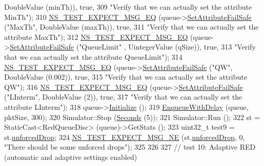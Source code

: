 \begin{DoxyCode}
      DoubleValue (minTh)), \textcolor{keyword}{true},
309                          \textcolor{stringliteral}{"Verify that we can actually set the attribute MinTh"});
310   \hyperlink{group__testing_ga7304ba46a28d8cf08dfdfd6499cf7068}{NS\_TEST\_EXPECT\_MSG\_EQ} (queue->\hyperlink{classns3_1_1ObjectBase_aa7d333004e970f925a4ed5df275541b5}{SetAttributeFailSafe} (\textcolor{stringliteral}{"MaxTh"}, 
      DoubleValue (maxTh)), \textcolor{keyword}{true},
311                          \textcolor{stringliteral}{"Verify that we can actually set the attribute MaxTh"});
312   \hyperlink{group__testing_ga7304ba46a28d8cf08dfdfd6499cf7068}{NS\_TEST\_EXPECT\_MSG\_EQ} (queue->\hyperlink{classns3_1_1ObjectBase_aa7d333004e970f925a4ed5df275541b5}{SetAttributeFailSafe} (\textcolor{stringliteral}{"QueueLimit"}
      , UintegerValue (qSize)), \textcolor{keyword}{true},
313                          \textcolor{stringliteral}{"Verify that we can actually set the attribute QueueLimit"});
314   \hyperlink{group__testing_ga7304ba46a28d8cf08dfdfd6499cf7068}{NS\_TEST\_EXPECT\_MSG\_EQ} (queue->\hyperlink{classns3_1_1ObjectBase_aa7d333004e970f925a4ed5df275541b5}{SetAttributeFailSafe} (\textcolor{stringliteral}{"QW"}, 
      DoubleValue (0.002)), \textcolor{keyword}{true},
315                          \textcolor{stringliteral}{"Verify that we can actually set the attribute QW"});
316   \hyperlink{group__testing_ga7304ba46a28d8cf08dfdfd6499cf7068}{NS\_TEST\_EXPECT\_MSG\_EQ} (queue->\hyperlink{classns3_1_1ObjectBase_aa7d333004e970f925a4ed5df275541b5}{SetAttributeFailSafe} (\textcolor{stringliteral}{"LInterm"}, 
      DoubleValue (2)), \textcolor{keyword}{true},
317                          \textcolor{stringliteral}{"Verify that we can actually set the attribute LInterm"});
318   queue->\hyperlink{classns3_1_1Object_af4411cb29971772fcd09203474a95078}{Initialize} ();
319   \hyperlink{classAredQueueDiscTestCase_a79ce3b6eab6abac51c635056d58b6d8b}{EnqueueWithDelay} (queue, pktSize, 300);
320   Simulator::Stop (\hyperlink{group__timecivil_ga33c34b816f8ff6628e33d5c8e9713b9e}{Seconds} (5));
321   Simulator::Run ();
322   st = StaticCast<RedQueueDisc> (queue)->GetStats ();
323   uint32\_t test9 = st.\hyperlink{structns3_1_1RedQueueDisc_1_1Stats_a242027f6eb7d30e2cd636c52080e2c73}{unforcedDrop};
324   \hyperlink{group__testing_ga6d4b162d26b8a930115b97dd5f3d9ed9}{NS\_TEST\_EXPECT\_MSG\_NE} (st.\hyperlink{structns3_1_1RedQueueDisc_1_1Stats_a242027f6eb7d30e2cd636c52080e2c73}{unforcedDrop}, 0, \textcolor{stringliteral}{"There should be some
       unforced drops"});
325 
326 
327   \textcolor{comment}{// test 10: Adaptive RED (automatic and adaptive settings enabled)}

\end{DoxyCode}
